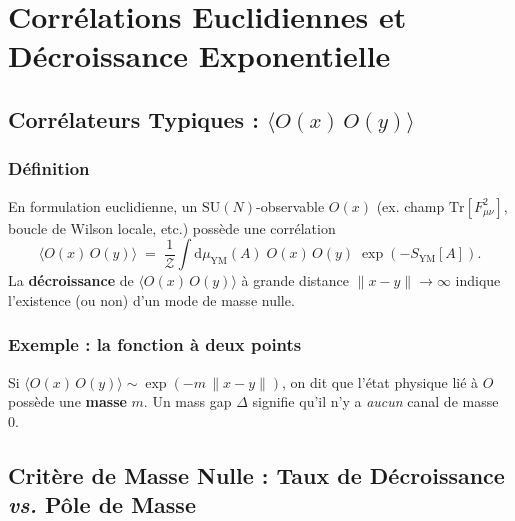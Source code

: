 \chapter{Corrélations Euclidiennes et Décroissance Exponentielle}
\label{chap:9}

\section{Corrélateurs Typiques : \texorpdfstring{\(\langle O(x)\,O(y)\rangle\)}{< O(x) O(y) >}}
\label{sec:9.1}

\subsection*{Définition}
En formulation euclidienne, un \(\mathrm{SU}(N)\)-observable \(O(x)\) (ex. champ \(\mathrm{Tr}[F_{\mu\nu}^2]\), boucle de Wilson locale, etc.) possède une corrélation
\[
\langle O(x)\,O(y)\rangle \;=\;
\frac{1}{\mathcal{Z}}\int \mathrm{d}\mu_{\mathrm{YM}}(A)\; O(x)\,O(y)\;\exp(-S_{\mathrm{YM}}[A]).
\]
La \textbf{décroissance} de \(\langle O(x)\,O(y)\rangle\) à grande distance \(\|x-y\|\to\infty\) indique l’existence (ou non) d’un mode de masse nulle.

\subsection*{Exemple : la \og fonction à deux points\fg}
Si \(\langle O(x)\,O(y)\rangle \sim \exp(-m\,\|x-y\|)\), on dit que l’état physique lié à \(O\) possède une \textbf{masse} \(m\). Un mass gap \(\Delta\) signifie qu’il n’y a \emph{aucun} canal de masse 0.

\vspace{1em}

\section{Critère de Masse Nulle : Taux de Décroissance \textit{vs.} Pôle de Masse}
\label{sec:9.2}

